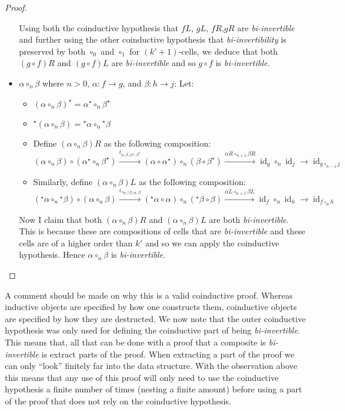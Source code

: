 \documentclass{article}
\theoremstyle{definition}
\theoremstyle{examplestyle}
\DeclareMathOperator{\id}{id}
\newcommand{\linv}[1]{{}^\star\!#1}
\newcommand{\rinv}[1]{#1^\star}
\begin{document}
\begin{proof}
\begin{itemize}
      Using both the coinductive hypothesis that \(fL\), \(gL\), \(fR\),\(gR\) are \emph{bi-invertible} and further using the other coinductive hypothesis that \emph{bi-invertibility} is preserved by both \(\circ_0\) and \(\circ_1\) for \((k'+1)\)-cells, we deduce that both \((g \circ f)R\) and \((g \circ f)L\) are \emph{bi-invertible} and so \(g \circ f\) is \emph{bi-invertible}.
    \item \(\alpha \circ_n \beta\) where \(n > 0\), \(\alpha: f \to g\), and \(\beta: h \to j\): Let:
      \begin{itemize}
      \item \(\rinv {(\alpha \circ_n \beta)} = \rinv \alpha \circ_n \rinv \beta\)
      \item \(\linv {(\alpha \circ_n \beta)} = \linv \alpha \circ_n \linv \beta\)
      \item Define \((\alpha \circ_n \beta)R\) as the following composition:
        \begin{equation*}
          (\alpha \circ_n \beta) \circ (\rinv \alpha \circ_n \rinv \beta) \overset {i_{\alpha,\beta,\rinv \alpha, \rinv \beta}} \to (\alpha \circ \rinv \alpha) \circ_n (\beta \circ \rinv \beta) \overset {\alpha R \circ_{n+1} \beta R} \to \id_g \circ_n \id_j \to \id_{g \circ_{n-1} j}
        \end{equation*}
      \item Similarly, define \((\alpha \circ_n \beta)L\) as the following composition:
        \begin{equation*}
          (\linv \alpha \circ_n \linv \beta) \circ (\alpha \circ_n \beta) \overset {i_{\linv \alpha, \linv \beta, \alpha, \beta}} \to (\linv \alpha \circ \alpha) \circ_n (\linv \beta \circ \beta) \overset {\alpha L \circ_{n+1} \beta L} \to \id_f \circ_n \id_h \to \id_{f \circ_n h}
        \end{equation*}
    \end{itemize}
    Now I claim that both \((\alpha \circ_n \beta)R\) and \((\alpha \circ_n \beta)L\) are both \emph{bi-invertible}. This is because these are compositions of cells that are \emph{bi-invertible} and these cells are of a higher order than \(k'\) and so we can apply the coinductive hypothesis. Hence \(\alpha \circ_n \beta\) is \emph{bi-invertible}.
  \end{itemize}
\end{proof}
A comment should be made on why this is a valid coinductive proof. Whereas inductive objects are specified by how one constructs them, coinductive objects are specified by how they are destructed. We now note that the outer coinductive hypothesis was only used for defining the coinductive part of being \emph{bi-invertible}. This means that, all that can be done with a proof that a composite is \emph{bi-invertible} is extract parts of the proof. When extracting a part of the proof we can only ``look'' finitely far into the data structure. With the observation above this means that any use of this proof will only need to use the coinductive hypothesis a finite number of times (nesting a finite amount) before using a part of the proof that does not rely on the coinductive hypothesis.
\end{document}
